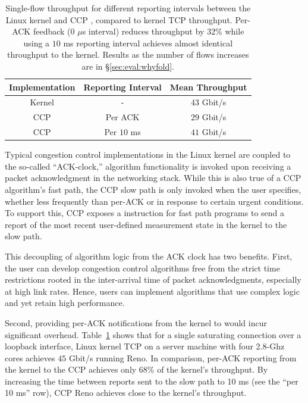 
\begin{table}[]
    \centering
    \begin{tabular}{c|c|c}
        Implementation & Reporting Interval & Mean Throughput \\
        \hline
        Kernel & - & $43$ Gbit/s \\
        CCP & Per ACK & $29$ Gbit/s \\
        CCP & Per $10$ ms & $41$ Gbit/s \\
    \end{tabular}
    \caption{Single-flow throughput for different reporting intervals between
      the Linux kernel and CCP \userspace, compared to kernel TCP
      throughput. Per-ACK feedback (0 $\mu$s interval) reduces throughput by
      32\% while using a $10$ ms reporting interval
      achieves almost identical throughput to the kernel. Results as the number
      of flows  increases are in
      \S\ref{sec:eval:whyfold}.}\label{tab:perf:interval}
\end{table}

 Typical congestion control
implementations in the Linux kernel are coupled to the so-called ``ACK-clock,''
\ie algorithm functionality is invoked upon receiving a packet acknowledgment in
the networking stack.
%
While this is also true of a CCP algorithm's fast path, the CCP slow path is
only invoked when the user specifies, whether less frequently than per-ACK or in response to certain urgent conditions.
%
To support this, CCP exposes a  instruction for fast path programs to send a
report of the most recent user-defined measurement state in the kernel to the slow path.

This decoupling of algorithm logic from the ACK clock has two benefits.
%
First, the user can develop congestion control algorithms free from the strict
time restrictions rooted in the inter-arrival time of packet acknowledgments,
especially at high link rates.
Hence, users can implement algorithms that use complex logic and yet retain high performance.

Second, providing per-ACK notifications from the kernel to \userspace would incur
significant overhead.
%
Table~\ref{tab:perf:interval} shows that for a single saturating 
connection over a loopback interface, Linux kernel TCP on a server machine
with four 2.8-Ghz cores achieves $45$ Gbit/s running Reno.
%
In comparison, per-ACK reporting from the kernel to the CCP \userspace achieves
only 68\% of the kernel's throughput.
%
By increasing the time between reports sent to the slow path to 10 ms (see the
``per 10 ms'' row), CCP Reno achieves close to the kernel's throughput.

